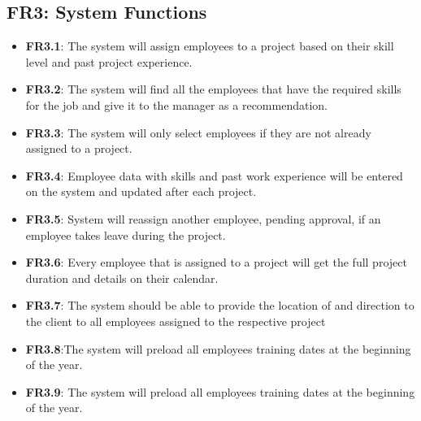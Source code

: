 \documentclass[]{article}
\begin{document}
	\subsection{FR3: System Functions}
	\begin{itemize}
		\item \textbf{FR3.1}: The system will assign employees to a project based
		on their skill level and past project experience. 
		
		\item \textbf{FR3.2}: The system will find all the employees that have the required skills     for the job and give it to the manager as a recommendation.
		
		\item \textbf{FR3.3}: The system will only select employees if they are not already           assigned to a project.
		
		\item \textbf{FR3.4}: Employee data with skills and past work experience
		will be entered on the system and updated after each project. 
		
		\item \textbf{FR3.5}: System will reassign another employee, pending 
		approval, if an employee takes leave during the project.
		
		\item \textbf{FR3.6}: Every employee that is assigned to a project will get
		the full project duration and details on their calendar. 
		
		\item \textbf{FR3.7}: The system should be able to provide the location of and direction      to the client to all employees assigned to the respective project
		
		\item \textbf{FR3.8}:The system will preload all employees training dates
		at the beginning of the year. 
		
		
		\item \textbf{FR3.9}: The system will preload all employees training dates at the beginning of the year.
	\end{itemize}
	
	
\end{document}
